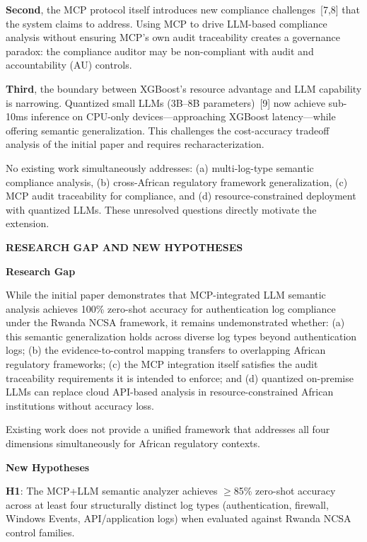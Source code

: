 \documentclass[12pt]{article}
\begin{document}
\textbf{Second}, the MCP protocol itself introduces new compliance challenges~[7,8] that the system claims to address. Using MCP to drive LLM-based compliance analysis without ensuring MCP's own audit traceability creates a governance paradox: the compliance auditor may be non-compliant with audit and accountability (AU) controls.

\textbf{Third}, the boundary between XGBoost's resource advantage and LLM capability is narrowing. Quantized small LLMs (3B--8B parameters)~[9] now achieve sub-10ms inference on CPU-only devices---approaching XGBoost latency---while offering semantic generalization. This challenges the cost-accuracy tradeoff analysis of the initial paper and requires recharacterization.

No existing work simultaneously addresses: (a) multi-log-type semantic compliance analysis, (b) cross-African regulatory framework generalization, (c) MCP audit traceability for compliance, and (d) resource-constrained deployment with quantized LLMs. These unresolved questions directly motivate the extension.

\bigskip

\textbf{RESEARCH GAP AND NEW HYPOTHESES}

\textbf{Research Gap}

While the initial paper demonstrates that MCP-integrated LLM semantic analysis achieves 100\% zero-shot accuracy for authentication log compliance under the Rwanda NCSA framework, it remains undemonstrated whether:
(a) this semantic generalization holds across diverse log types beyond authentication logs;
(b) the evidence-to-control mapping transfers to overlapping African regulatory frameworks;
(c) the MCP integration itself satisfies the audit traceability requirements it is intended to enforce;
and (d) quantized on-premise LLMs can replace cloud API-based analysis in resource-constrained African institutions without accuracy loss.

Existing work does not provide a unified framework that addresses all four dimensions simultaneously for African regulatory contexts.

\textbf{New Hypotheses}

\textbf{H1}: The MCP+LLM semantic analyzer achieves $\geq$85\% zero-shot accuracy across at least four structurally distinct log types (authentication, firewall, Windows Events, API/application logs) when evaluated against Rwanda NCSA control families.
\end{document}
